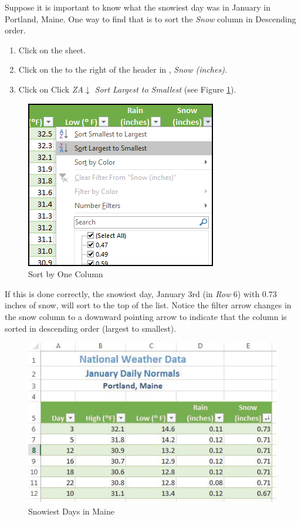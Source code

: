 Suppose it is important to know what the snowiest day was in January in Portland, Maine. One way to find that is to sort the \textit{Snow} column in Descending order.

\begin{enumbox}
	\begin{enumerate}
		\item Click on the  sheet.
		\item Click on the  to the right of the header in , \textit{Snow (inches)}.
		\item Click on Click \textit{ZA$ \downarrow $ Sort Largest to Smallest} (see Figure \ref{05:fig08}).
	\end{enumerate}
\end{enumbox}
	
\begin{figure}[H]
	\centering
	\includegraphics[width=\maxwidth{.65\linewidth}]{gfx/ch05_fig08}
	\caption{Sort by One Column}
	\label{05:fig08}
\end{figure}

If this is done correctly, the snowiest day, January 3rd (in \textit{Row} $ 6 $) with $ 0.73 $ inches of snow, will sort to the top of the list. Notice the filter arrow changes in the snow column to a downward pointing arrow to indicate that the column is sorted in descending order (largest to smallest).

\begin{figure}[H]
	\centering
	\includegraphics[width=\maxwidth{.95\linewidth}]{gfx/ch05_fig09}
	\caption{Snowiest Days in Maine}
	\label{05:fig09}
\end{figure}

